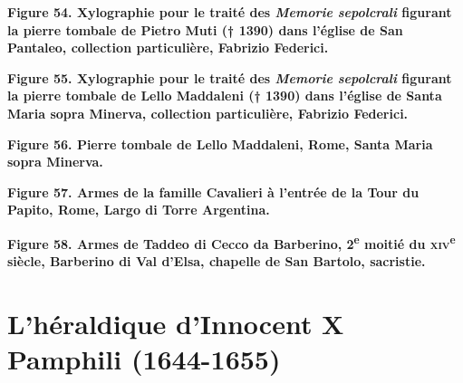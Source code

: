 \documentclass[12pt,twoside,openany]{book}
\begin{document}
\begin{center}
\par\small \textbf{Figure 54. Xylographie pour le traité des \textit{Memorie sepolcrali} figurant la pierre tombale de Pietro Muti († 1390) dans l’église de San Pantaleo, collection particulière, Fabrizio Federici.}
\end{center}

\begin{center}
\par\small \textbf{Figure 55. Xylographie pour le traité des \textit{Memorie sepolcrali} figurant la pierre tombale de Lello Maddaleni († 1390) dans l’église de Santa Maria sopra Minerva, collection particulière, Fabrizio Federici.}
\end{center}

\begin{center}
\par\small \textbf{Figure 56. Pierre tombale de Lello Maddaleni, Rome, Santa Maria sopra Minerva.}
\end{center}

\begin{center}
\par\small \textbf{Figure 57. Armes de la famille Cavalieri à l’entrée de la Tour du Papito, Rome, Largo di Torre Argentina.}
\end{center}

\begin{center}
\par\small \textbf{Figure 58. Armes de Taddeo di Cecco da Barberino, 2\textsuperscript{e} moitié du \textsc{xiv}\textsuperscript{e} siècle, Barberino di Val d’Elsa, chapelle de San Bartolo, sacristie.}
\end{center}

\chapter{L’héraldique d’Innocent X Pamphili (1644-1655)}
\end{document}
